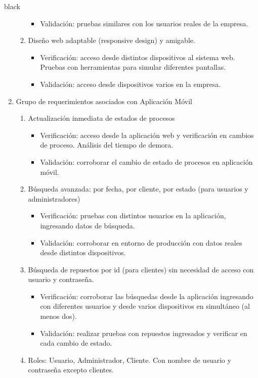 \documentclass[11pt]{charter}
\begin{document}
\begin{consigna}{black}
\begin{enumerate}
\begin{enumerate}
\begin{itemize}
	\item Validación: pruebas similares con los usuarios reales de la empresa.  
	\end{itemize}
	\item Diseño web adaptable (responsive design) y amigable.
	\begin{itemize}
	\item Verificación: acceso desde distintos dispositivos al sistema web. Pruebas con herramientas para simular diferentes pantallas.
	\item Validación: acceso desde dispositivos varios en la empresa.  
	\end{itemize}
	\end{enumerate}
\item Grupo de requerimientos asociados con Aplicación Móvil
	\begin{enumerate}
	\item Actualización inmediata de estados de procesos
	\begin{itemize}
	\item Verificación: acceso desde la aplicación web y verificación en cambios de proceso. Análisis del tiempo de demora.
	\item Validación: corroborar el cambio de estado de procesos en aplicación móvil.  
	\end{itemize}
	\item Búsqueda avanzada: por fecha, por cliente, por estado (para usuarios y administradores)
	\begin{itemize}
	\item Verificación: pruebas con distintos usuarios en la aplicación, ingresando datos de búsqueda. 
	\item Validación: corroborar en entorno de producción con datos reales desde distintos dispositivos.  
	\end{itemize}
	\item Búsqueda de repuestos por id (para clientes) sin necesidad de acceso con usuario y contraseña.
	\begin{itemize}
	\item Verificación: corroborar las búsquedas desde la aplicación ingresando con diferentes usuarios y desde varios dispositivos en simultáneo (al menos dos).  
	\item Validación: realizar pruebas con repuestos ingresados y verificar en cada cambio de estado.  
	\end{itemize}
	\item Roles: Usuario, Administrador, Cliente. Con nombre de usuario y contraseña excepto clientes.

\end{enumerate}
\end{enumerate}
\end{consigna}
\end{document}
